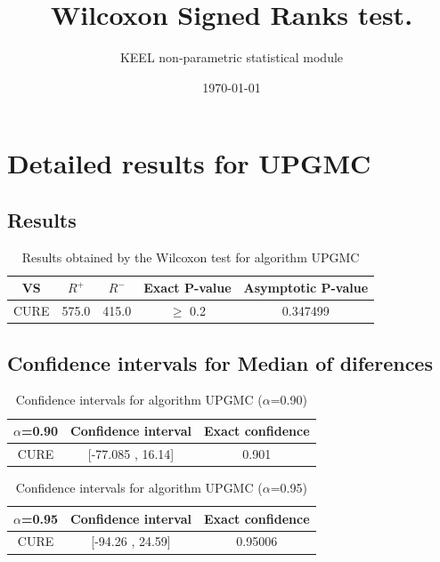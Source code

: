 \documentclass[a4paper,10pt]{article}
\title{Wilcoxon Signed Ranks test.}
\date{\today}
\author{KEEL non-parametric statistical module}
\begin{document}
\pagestyle{empty}
\maketitle
\thispagestyle{empty}



\section{Detailed results for UPGMC}


\subsection{Results}

\begin{table}[!htp]
\centering\small
\begin{tabular}{
|c|c|c|c|c|}
\hline
 VS & $R^{+}$ & $R^{-}$ & Exact P-value & Asymptotic P-value \\ \hline 
CURE & 575.0 & 415.0 & $\geq$ 0.2 & 0.347499\\ \hline 

\end{tabular}
\caption{Results obtained by the Wilcoxon test for algorithm UPGMC}
\end{table}

\subsection{Confidence intervals for Median of diferences}

\begin{table}[!htp]
\centering\small
\begin{tabular}{
|c|c|c|}
\hline
 $\alpha$=0.90 & Confidence interval & Exact confidence \\ \hline 
CURE & [-77.085 , 16.14] & 0.901\\ \hline 

\end{tabular}
\caption{Confidence intervals for algorithm UPGMC ($\alpha$=0.90)}
\end{table}
\begin{table}[!htp]
\centering\small
\begin{tabular}{
|c|c|c|}
\hline
 $\alpha$=0.95 & Confidence interval & Exact confidence \\ \hline 
CURE & [-94.26 , 24.59] & 0.95006\\ \hline 

\end{tabular}
\caption{Confidence intervals for algorithm UPGMC ($\alpha$=0.95)}
\end{table}
\end{document}
